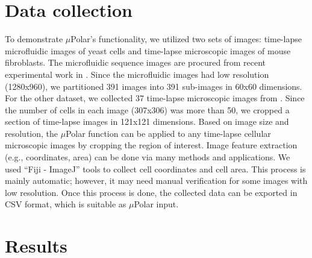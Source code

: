 \documentclass[conference]{IEEEtran}
\begin{document}

\section{Data collection}
 To demonstrate $\mu$Polar's functionality, we utilized two sets of images: time-lapse microfluidic images of yeast cells and time-lapse microscopic images of mouse fibroblasts. The microfluidic sequence images are procured from recent experimental work in  \cite{r13}. Since the microfluidic images had low resolution (1280x960), we partitioned 391 images into 391 sub-images in 60x60 dimensions. For the other dataset, we collected 37 time-lapse microscopic images from \cite{r20}. Since the number of cells in each image (307x306) was more than 50, we cropped a section of time-lapse images in 121x121 dimensions. Based on image size and resolution, the $\mu$Polar function can be applied to any time-lapse cellular microscopic images by cropping the region of interest. Image feature extraction (e.g., coordinates, area) can be done via many methods and applications. We used ``Fiji - ImageJ'' tools to collect cell coordinates and cell area. This process is mainly automatic; however, it may need manual verification for some images with low resolution. Once this process is done, the collected data can be exported in CSV format, which is suitable as $\mu$Polar  input.  


\section{Results}
\end{document}
